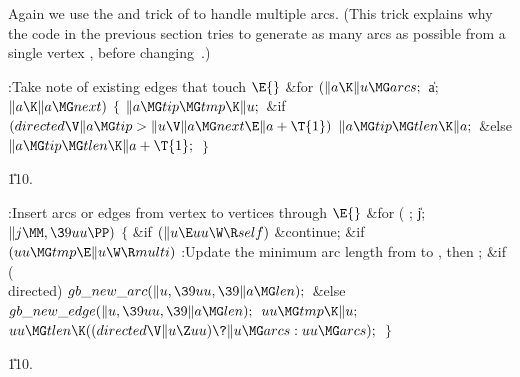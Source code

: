 Again we use the  and  trick of 
to handle
multiple arcs. (This trick explains why the code in the previous
section tries to generate as many arcs as possible from a single
vertex , before changing~.)

\Y\B\4:Take note of existing edges that touch \X${}\E{}$\6
\&{for} ${}(\|a\K\|u\MG\\{arcs};{}$ \|a; ${}\|a\K\|a\MG\\{next}){}$\5
${}\{{}$\1\6
${}\|a\MG\\{tip}\MG\\{tmp}\K\|u;{}$\6
\&{if} ${}(\\{directed}\V\|a\MG\\{tip}>\|u\V\|a\MG\\{next}\E\|a+\T{1}){}$\1\5
${}\|a\MG\\{tip}\MG\\{tlen}\K\|a;{}$\2\6
\&{else}\1\5
${}\|a\MG\\{tip}\MG\\{tlen}\K\|a+\T{1};{}$\2\6
\4${}\}{}$\2\par
\U110.\fi

\B{}:Insert arcs or edges from vertex  to vertices  through \X${}\E{}$\6
\&{for} ( ; \|j; ${}\|j\MM,\39\\{uu}\PP){}$\5
${}\{{}$\1\6
\&{if} ${}(\|u\E\\{uu}\W\R\\{self}){}$\1\5
\&{continue};\2\6
\&{if} ${}(\\{uu}\MG\\{tmp}\E\|u\W\R\\{multi}){}$\1\5
:Update the minimum arc length from  to , then \X;\2\6
\&{if} (\\{directed})\1\5
${}\\{gb\_new\_arc}(\|u,\39\\{uu},\39\|a\MG\\{len});{}$\2\6
\&{else}\1\5
${}\\{gb\_new\_edge}(\|u,\39\\{uu},\39\|a\MG\\{len});{}$\2\6
${}\\{uu}\MG\\{tmp}\K\|u;{}$\6
${}\\{uu}\MG\\{tlen}\K((\\{directed}\V\|u\Z\\{uu})\?\|u\MG\\{arcs}:\\{uu}\MG%
\\{arcs});{}$\6
\4${}\}{}$\2\par
\U110.\fi

